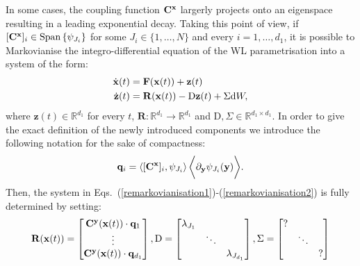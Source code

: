 \documentclass[12pt]{article}
\begin{document}
In some cases, the coupling function $\mathbf{C}^{\mathbf{x}}$ largerly projects onto an eigenspace resulting in a leading exponential decay. Taking this point of view, if $[\mathbf{C}^{\mathbf{x}}]_i \in \mathrm{Span}\left\{ \psi_{J_i}\right\} $ for some $J_i \in \{1,\ldots,N\}$ and every $i=1,\ldots,d_1$, it is possible to Markovianise the integro-differential equation of the WL parametrisation into a system of the form:
\begin{align}\label{remarkovianisation1}
	\dot{\mathbf{x}}(t) & = \mathbf{F} (\mathbf{x}(t)) + \mathbf{z}(t) \\ \label{remarkovianisation2} 
	\dot{\mathbf{z}}(t) & =
	\mathbf{R}(\mathbf{x}(t))-
	\mathrm{D}\mathbf{z}(t) + \Sigma \mathrm{d} W,
\end{align}
where $\mathbf{z}(t)\in \mathbb{R}^{d_1} $ for every $t$, $\mathbf{R}: \mathbb{R}^{d_1}\longrightarrow \mathbb{R}^{d_1}$ and $\mathrm{D},\Sigma \in \mathbb{R}^{d_1 \times d_1}$. In order to give the exact definition of the newly introduced components we introduce the following notation for the sake of compactness: 
\begin{equation}
\mathbf{q}_i = \left\langle [\mathbf{C} ^{\mathbf{x}}]_i,\psi_{J_i} \right\rangle \bigg \langle \partial _{\mathbf{y}}\psi _{J_i} (\mathbf{y})  \bigg \rangle.
\end{equation}
Then, the system in Eqs.~(\ref{remarkovianisation1})-(\ref{remarkovianisation2}) is fully determined by setting:
\begin{align}
	\mathbf{R}(\mathbf{x}(t))=\begin{bmatrix}
		\mathbf{C}^{\mathbf{y}}(\mathbf{x}(t))\cdot \mathbf{q}_1 \\ \vdots \\ 	\mathbf{C}^{\mathbf{y}}(\mathbf{x}(t))\cdot \mathbf{q}_{d_1}
	\end{bmatrix},
	\mathrm{D}=\begin{bmatrix}
		\lambda_{J_1} && \\ &\ddots & \\ && \lambda _{J_{d_1}}
	\end{bmatrix}, \Sigma=\begin{bmatrix}
		? && \\ &\ddots & \\ && ?
	\end{bmatrix}
\end{align}
\end{document}
